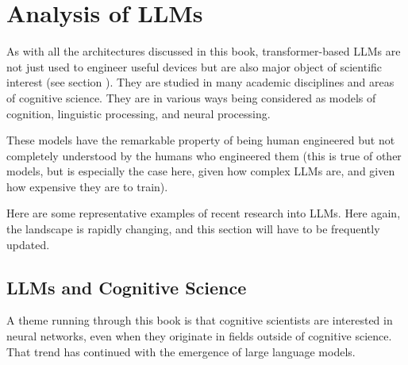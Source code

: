 \section{Analysis of LLMs}


As with all the architectures discussed in this book, transformer-based LLMs are not just used to engineer useful devices but are also major object of scientific interest (see section ). They are studied in many academic disciplines and areas of cognitive science. They are in various ways being considered as models of cognition, linguistic processing, and neural processing. 

These models have the remarkable property of being human engineered but not completely understood by the humans who engineered them (this is true of other models, but is especially the case here, given how complex LLMs are, and given how expensive they are to train). 

Here are some representative examples of recent research into LLMs.  Here again, the landscape is rapidly changing, and this section will have to be frequently updated.

\subsection{LLMs and Cognitive Science}\label{llm_cogsci}

A theme running through this book is that cognitive scientists are interested in neural networks, even when they originate in fields outside of cognitive science. That trend has continued with the emergence of large language models.

